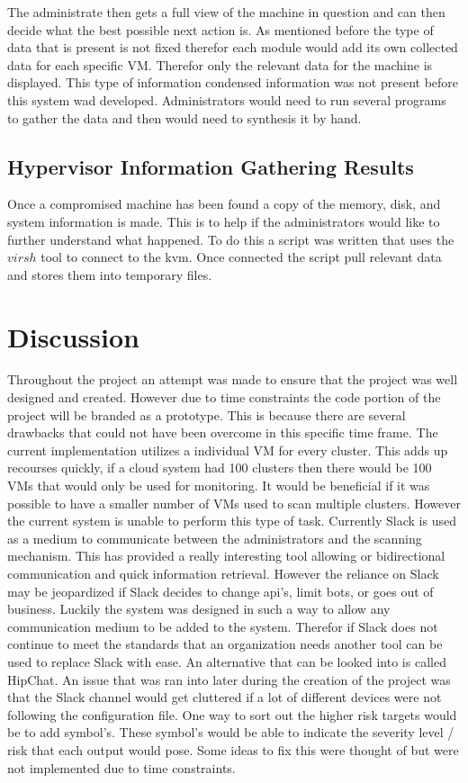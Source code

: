 \documentclass[12pt]{article}
\begin{document}
The administrate then gets a full view of the machine in question and can then decide what the best possible next action is. As mentioned before the type of data that is present is not fixed therefor each module would add its own collected data for each specific VM. Therefor only the relevant data for the machine is displayed. This type of information condensed information was not present before this system wad developed. Administrators would need to run several programs to gather the data and then would need to synthesis it by hand.

\subsection{Hypervisor Information Gathering Results}
Once a compromised machine has been found a copy of the memory, disk, and system information is made. This is to help if the administrators would like to further understand what happened. To do this a script was written that uses the $virsh$ tool to connect to the kvm. Once connected the script pull relevant data and stores them into temporary files. 

\section{Discussion}
Throughout the project an attempt was made to ensure that the project was well designed and created. However due to time constraints the code portion of the project will be branded as a prototype. This is because there are several drawbacks that could not have been overcome in this specific time frame. The current implementation utilizes a individual VM for every cluster. This adds up recourses quickly, if a cloud system had 100 clusters then there would be 100 VMs that would only be used for monitoring. It would be beneficial if it was possible to have a smaller number of VMs used to scan multiple clusters. However the current system is unable to perform this type of task. Currently Slack is used as a medium to communicate between the administrators and the scanning mechanism. This has provided a really interesting tool allowing or bidirectional communication and quick information retrieval. However the reliance on Slack may be jeopardized if Slack decides to change api's, limit bots, or goes out of business. Luckily the system was designed in such a way to allow any communication medium to be added to the system. Therefor if Slack does not continue to meet the standards that an organization needs another tool can be used to replace Slack with ease. An alternative that can be looked into is called HipChat.  An issue that was ran into later during the creation of the project was that the Slack channel would get cluttered if a lot of different devices were not following the configuration file. One way to sort out the higher risk targets would be to add symbol's. These symbol's would be able to indicate the severity level / risk that each output would pose. Some ideas to fix this were thought of but were not implemented due to time constraints.
\end{document}
